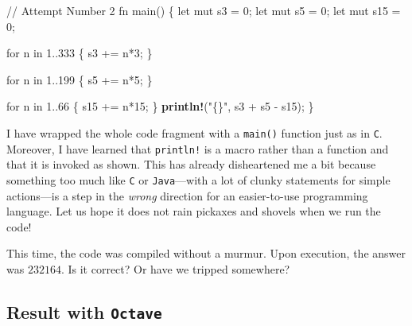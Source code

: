 \documentclass[
  a4paper,
]{article}
\newenvironment{Shaded}{\begin{snugshade}}{\end{snugshade}}
\newcommand{\CommentTok}[1]{\textcolor[rgb]{0.50,0.62,0.50}{#1}}
\newcommand{\ControlFlowTok}[1]{\textcolor[rgb]{0.94,0.87,0.69}{#1}}
\newcommand{\DecValTok}[1]{\textcolor[rgb]{0.86,0.86,0.80}{#1}}
\newcommand{\KeywordTok}[1]{\textcolor[rgb]{0.94,0.87,0.69}{#1}}
\newcommand{\NormalTok}[1]{\textcolor[rgb]{0.80,0.80,0.80}{#1}}
\newcommand{\OperatorTok}[1]{\textcolor[rgb]{0.94,0.94,0.82}{#1}}
\newcommand{\PreprocessorTok}[1]{\textcolor[rgb]{1.00,0.81,0.69}{\textbf{#1}}}
\newcommand{\StringTok}[1]{\textcolor[rgb]{0.80,0.58,0.58}{#1}}
\begin{document}
\begin{Shaded}
\begin{Highlighting}[]
 \CommentTok{// Attempt Number 2}
\KeywordTok{fn}\NormalTok{ main() }\OperatorTok{\{}
  \KeywordTok{let} \KeywordTok{mut}\NormalTok{ s3 }\OperatorTok{=} \DecValTok{0}\OperatorTok{;}
  \KeywordTok{let} \KeywordTok{mut}\NormalTok{ s5 }\OperatorTok{=} \DecValTok{0}\OperatorTok{;}
  \KeywordTok{let} \KeywordTok{mut}\NormalTok{ s15 }\OperatorTok{=} \DecValTok{0}\OperatorTok{;}

  \ControlFlowTok{for}\NormalTok{ n }\KeywordTok{in} \DecValTok{1}\OperatorTok{..}\DecValTok{333} \OperatorTok{\{}
\NormalTok{    s3 }\OperatorTok{+=}\NormalTok{ n}\OperatorTok{*}\DecValTok{3}\OperatorTok{;}
  \OperatorTok{\}}

  \ControlFlowTok{for}\NormalTok{ n }\KeywordTok{in} \DecValTok{1}\OperatorTok{..}\DecValTok{199} \OperatorTok{\{}
\NormalTok{    s5 }\OperatorTok{+=}\NormalTok{ n}\OperatorTok{*}\DecValTok{5}\OperatorTok{;}
  \OperatorTok{\}}

  \ControlFlowTok{for}\NormalTok{ n }\KeywordTok{in} \DecValTok{1}\OperatorTok{..}\DecValTok{66} \OperatorTok{\{}
\NormalTok{    s15 }\OperatorTok{+=}\NormalTok{ n}\OperatorTok{*}\DecValTok{15}\OperatorTok{;}
  \OperatorTok{\}}
  \PreprocessorTok{println!}\NormalTok{(}\StringTok{"\{\}"}\OperatorTok{,}\NormalTok{ s3 }\OperatorTok{+}\NormalTok{ s5 }\OperatorTok{{-}}\NormalTok{ s15)}\OperatorTok{;}
  \OperatorTok{\}}
\end{Highlighting}
\end{Shaded}

I have wrapped the whole code fragment with a \texttt{main()} function
just as in \texttt{C}. Moreover, I have learned that \texttt{println!}
is a macro rather than a function and that it is invoked as shown. This
has already disheartened me a bit because something too much like
\texttt{C} or \texttt{Java}---with a lot of clunky statements for simple
actions---is a step in the \emph{wrong} direction for an easier-to-use
programming language. Let us hope it does not rain pickaxes and shovels
when we run the code!

This time, the code was compiled without a murmur. Upon execution, the
answer was \(232164\). Is it correct? Or have we tripped somewhere?

\hypertarget{result-with-octave}{%
\subsection{\texorpdfstring{Result with
\texttt{Octave}}{Result with Octave}}\label{result-with-octave}}
\end{document}
